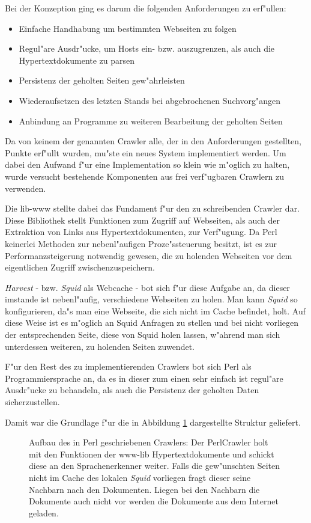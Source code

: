 Bei der Konzeption ging es darum die folgenden Anforderungen zu erf"ullen:
\begin{itemize}
	\item Einfache Handhabung um bestimmten Webseiten zu folgen
	\item Regul"are Ausdr"ucke, um Hosts ein- bzw. auszugrenzen, als auch die Hypertextdokumente zu parsen
	\item Persistenz der geholten Seiten gew"ahrleisten
	\item Wiederaufsetzen des letzten Stands bei abgebrochenen Suchvorg"angen
	\item Anbindung an Programme zu weiteren Bearbeitung der geholten Seiten
\end{itemize}

Da von keinem der genannten Crawler alle, der in den Anforderungen gestellten, Punkte erf"ullt wurden, mu"ste ein neues System implementiert werden. Um dabei den Aufwand f"ur eine Implementation so klein wie m"oglich zu halten, wurde versucht bestehende Komponenten aus frei verf"ugbaren Crawlern zu verwenden.

Die lib-www stellte dabei das Fundament f"ur den zu schreibenden Crawler dar. Diese Bibliothek stellt Funktionen zum Zugriff auf Webseiten, als auch der Extraktion von Links aus Hypertextdokumenten, zur Verf"ugung. Da Perl keinerlei Methoden zur nebenl"aufigen Proze"ssteuerung besitzt, ist es zur Performanzsteigerung notwendig gewesen, die zu holenden Webseiten vor dem eigentlichen Zugriff zwischenzuspeichern.

{\em Harvest} - bzw. {\em Squid} als Webcache - bot sich f"ur diese Aufgabe an, da dieser imstande ist nebenl"aufig, verschiedene Webseiten zu holen. Man kann {\em Squid} so konfigurieren, da"s man eine Webseite, die sich nicht im Cache befindet, holt. Auf diese Weise ist es m"oglich an Squid Anfragen zu stellen und bei nicht vorliegen der entsprechenden Seite, diese von Squid holen lassen, w"ahrend man sich unterdessen weiteren, zu holenden Seiten zuwendet.

F"ur den Rest des zu implementierenden Crawlers bot sich Perl als Programmiersprache an, da es in dieser zum einen sehr einfach ist regul"are Ausdr"ucke zu behandeln, als auch die Persistenz der geholten Daten sicherzustellen.

Damit war die Grundlage f"ur die in Abbildung \ref{AufbauDesPerlProgramms} dargestellte Struktur geliefert.

\begin{figure}[t]
	\caption{Aufbau des in Perl geschriebenen Crawlers: Der PerlCrawler holt mit den Funktionen der www-lib Hypertextdokumente und schickt diese an den Sprachenerkenner weiter. Falls die gew"unschten Seiten nicht im Cache des lokalen {\em Squid} vorliegen fragt dieser seine Nachbarn nach den Dokumenten. Liegen bei den Nachbarn die Dokumente auch nicht vor werden die Dokumente aus dem Internet geladen.}
	\label{AufbauDesPerlProgramms}
\end{figure}


